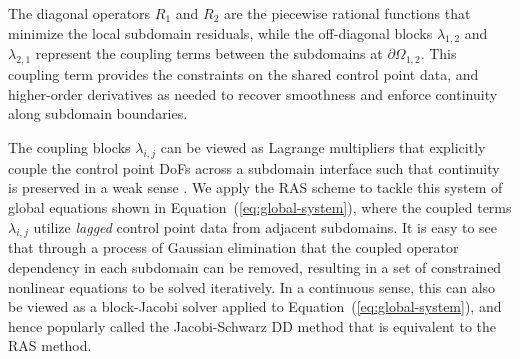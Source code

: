 \documentclass[conference]{IEEEtran}
\newcommand{\eqt}[1]{Equation~(\ref{#1})}
\begin{document}

The diagonal operators $R_{1}$ and $R_{2}$ are the piecewise rational functions that minimize the local subdomain residuals, while the off-diagonal blocks $\lambda_{1,2}$ and $\lambda_{2,1}$ represent the coupling terms between the subdomains at $\partial \Omega_{1,2}$. This coupling term provides the constraints on the shared control point data, and higher-order derivatives as needed to recover smoothness and enforce continuity along subdomain boundaries. 

The coupling blocks $\lambda_{i,j}$ can be viewed as Lagrange multipliers that explicitly couple the control point DoFs across a subdomain interface such that continuity is preserved in a weak sense \cite{nurbs-book}. We apply the RAS scheme to tackle this system of global equations shown in \eqt{eq:global-system}, where the coupled terms $\lambda_{i,j}$ utilize \textit{lagged} control point data from adjacent subdomains. It is easy to see that through a process of Gaussian elimination that the coupled operator dependency in each subdomain can be removed, resulting in a set of constrained nonlinear equations to be solved iteratively. In a continuous sense, this can also be viewed as a block-Jacobi solver applied to \eqt{eq:global-system}, and hence popularly called the Jacobi-Schwarz DD method \cite{gander-rasm} that is equivalent to the RAS method.
\end{document}
